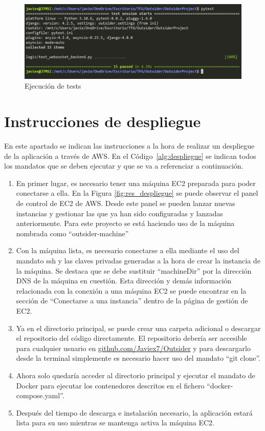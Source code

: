 \begin{figure}[h]
	\centering
	\includegraphics[width=\textwidth,clip=true]{res_testing.png}
	\caption{Ejecución de tests}
	\label{fig:res_testing}
\end{figure}

\section{Instrucciones de despliegue}
\label{sect:despliegue}

En este apartado se indican las instrucciones a la hora de realizar un despliegue de la aplicación a través de AWS. En el Código~\ref{alg:despliegue} se indican todos los mandatos que se deben ejecutar
y que se va a referenciar a continuación.

\begin{enumerate}
	\item En primer lugar, es necesario tener una máquina EC2 preparada para poder conectarse a ella. En la Figura \ref{fig:res_despliegue} se puede
		  observar el panel de control de EC2 de AWS. Desde este panel se pueden lanzar nuevas instancias y gestionar las que ya han sido configuradas
		  y lanzadas anteriormente. Para este proyecto se está haciendo uso de la máquina nombrada como ``outsider-machine''
	\item Con la máquina lista, es necesario conectarse a ella mediante el uso del mandato ssh y las claves privadas generadas
		  a la hora de crear la instancia de la máquina.
		  Se destaca que se debe sustituir ``machineDir'' por la dirección DNS de la máquina en cuestión. Esta dirección y demás información
		  relacionada con la conexión a una máquina EC2 se puede encontrar en la sección de ``Conectarse a una instancia'' dentro de la página de 
		  gestión de EC2.
	\item Ya en el directorio principal, se puede crear una carpeta adicional o descargar el repositorio del código directamente. 
	      El repositorio debería ser accesible para cualquier usuario en \href{https://github.com/Javiex7/Outsider}{github.com/Javiex7/Outsider} y para descargarlo desde 
		  la terminal simplemente es necesario hacer uso del mandato ``git clone''.
	\item Ahora solo quedaría acceder al directorio principal y ejecutar el mandato de Docker para ejecutar los contenedores
		  descritos en el fichero ``docker-compose.yaml''.
	\item Después del tiempo de descarga e instalación necesario, la aplicación estará lista para su uso mientras se mantenga activa la
		  máquina EC2.
\end{enumerate}	

